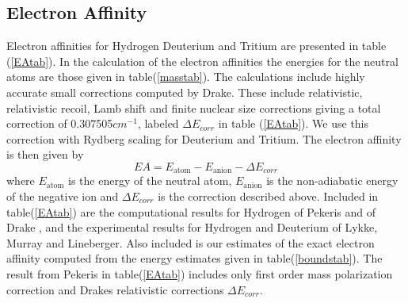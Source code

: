\documentclass[12pt,thmsa]{article}
\begin{document}
\subsection{Electron Affinity}

Electron affinities for Hydrogen Deuterium and Tritium are presented in
table (\ref{EAtab}). In the calculation of the electron affinities the
energies for the neutral atoms are those given in table(\ref{masstab}). The
calculations include highly accurate small corrections computed by Drake\cite
{Drake88}. These include relativistic, relativistic recoil, Lamb shift and
finite nuclear size corrections giving a total correction of 0.307505$cm^{-1}
$, labeled $\Delta E_{corr}$ in table (\ref{EAtab}). We use this correction
with Rydberg scaling for Deuterium and Tritium. The electron affinity is
then given by 
\begin{equation}
EA=E_{\text{atom}}-E_{\text{anion}}-\Delta E_{corr}
\end{equation}
where $E_{\text{atom}}$ is the energy of the neutral atom, $E_{\text{anion}}$
is the non-adiabatic energy of the negative ion and $\Delta E_{corr}$ is the
correction described above. Included in table(\ref{EAtab}) are the
computational results for Hydrogen of Pekeris\cite{Pekeris62} and of Drake%
\cite{Drake88}, and the experimental results for Hydrogen and Deuterium of
Lykke, Murray and Lineberger\cite{Lykke91}. Also included is our estimates
of the exact electron affinity computed from the energy estimates given in
table(\ref{boundstab}). The result from Pekeris in table(\ref{EAtab})
includes only first order mass polarization correction and Drakes
relativistic corrections $\Delta E_{corr}.$
\end{document}

